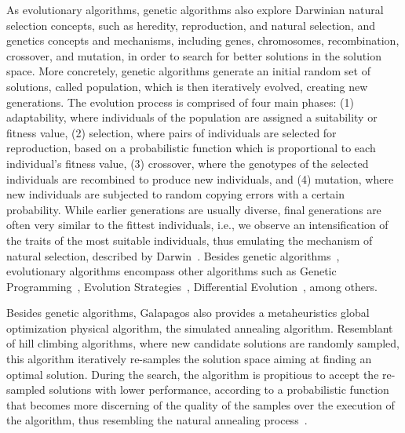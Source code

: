 	As evolutionary algorithms, genetic algorithms also explore Darwinian natural selection concepts, such as heredity, reproduction, and natural selection, and genetics concepts and mechanisms, including genes, chromosomes, recombination, crossover, and mutation, in order to search for better solutions in the solution space. More concretely, genetic algorithms generate an initial random set of solutions, called population, which is then iteratively evolved, creating new generations. The evolution process is comprised of four main phases: (1) adaptability, where individuals of the population are assigned a suitability or fitness value, (2) selection, where pairs of individuals are selected for reproduction, based on a probabilistic function which is proportional to each individual's fitness value, (3) crossover, where the genotypes of the selected individuals are recombined to produce new individuals, and (4) mutation, where new individuals are subjected to random copying errors with a certain probability. While earlier generations are usually diverse, final generations are often very similar to the fittest individuals, i.e., we observe an intensification of the traits of the most suitable individuals, thus emulating the mechanism of natural selection, described by Darwin~\cite{Brownlee2011}. Besides genetic algorithms~\cite{Golberg1989,Holland1992}, evolutionary algorithms encompass other algorithms such as Genetic Programming~\cite{Koza1992}, Evolution Strategies~\cite{Schwefel1981}, Differential Evolution~\cite{Storn1997}, among others. 
	
	Besides genetic algorithms, Galapagos also provides a metaheuristics global optimization physical algorithm, the simulated annealing algorithm. Resemblant of hill climbing algorithms, where new candidate solutions are randomly sampled, this algorithm iteratively re-samples the solution space aiming at finding an optimal solution. During the search, the algorithm is propitious to accept the re-sampled solutions with lower performance, according to a probabilistic function that becomes more discerning of the quality of the samples over the execution of the algorithm, thus resembling the natural annealing process~\cite{Brownlee2011}. 

